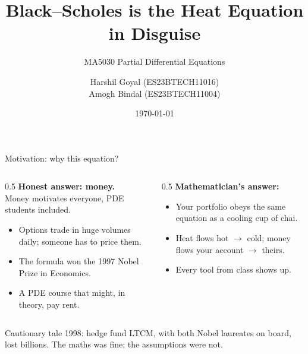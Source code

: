 \documentclass[11pt]{beamer}
\title[Black--Scholes = Heat Equation]{Black--Scholes is the Heat Equation in Disguise}
\subtitle{MA5030 Partial Differential Equations}
\author[Goyal \& Bindal]{Harshil Goyal (ES23BTECH11016)\\Amogh Bindal (ES23BTECH11004)}
\institute[IIT Hyderabad]{Indian Institute of Technology Hyderabad}
\date{\today}
\begin{document}
\begin{frame}
  \titlepage
\end{frame}

\begin{frame}{Motivation: why this equation?}
  \small
  \begin{columns}[t]
    \begin{column}{0.5\textwidth}
      \textbf{Honest answer: money.}\\
      Money motivates everyone, PDE students included.
      \begin{itemize}
        \item Options trade in huge volumes daily; someone has to price them.
        \item The formula won the 1997 Nobel Prize in Economics.
        \item A PDE course that might, in theory, pay rent.
      \end{itemize}
    \end{column}
    \begin{column}{0.5\textwidth}
      \textbf{Mathematician's answer:}
      \begin{itemize}
        \item Your portfolio obeys the same equation as a cooling cup of chai.
        \item Heat flows hot $\to$ cold; money flows your account $\to$ theirs.
        \item Every tool from class shows up.
      \end{itemize}
    \end{column}
  \end{columns}
  \vspace{6pt}
  \begin{alertblock}{Cautionary tale}
    1998: hedge fund LTCM, with both Nobel laureates on board, lost billions.
    The maths was fine; the assumptions were not.
  \end{alertblock}
\end{frame}
\end{document}
